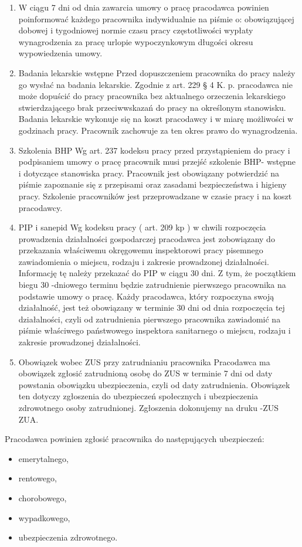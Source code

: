 \documentclass[a4paper, 11pt]{article}
\begin{document}
\begin{enumerate}

\item W ciągu 7 dni od dnia zawarcia umowy o pracę pracodawca powinien poinformować każdego pracownika indywidualnie na piśmie o:
obowiązującej dobowej i tygodniowej normie czasu pracy
częstotliwości wypłaty wynagrodzenia za pracę
urlopie wypoczynkowym
długości okresu wypowiedzenia umowy.
\item  Badania lekarskie wstępne
Przed dopuszczeniem pracownika do pracy należy go wysłać na badania lekarskie.
Zgodnie z art. 229 § 4 K. p. pracodawca nie może dopuścić do pracy pracownika bez aktualnego orzeczenia lekarskiego stwierdzającego brak przeciwwskazań do pracy na określonym stanowisku.
Badania lekarskie wykonuje się na koszt pracodawcy i w miarę możliwości w godzinach pracy.
Pracownik zachowuje za ten okres prawo do wynagrodzenia.
\item  Szkolenia BHP
Wg art. 237 kodeksu pracy przed przystąpieniem do pracy i podpisaniem umowy o pracę pracownik musi przejść szkolenie BHP- wstępne i dotyczące stanowiska pracy. Pracownik jest obowiązany potwierdzić na piśmie zapoznanie się z przepisami oraz zasadami bezpieczeństwa i higieny pracy.
Szkolenie pracowników jest przeprowadzane w czasie pracy i na koszt pracodawcy.
\item PIP i sanepid
Wg kodeksu pracy ( art. 209 kp ) w chwili rozpoczęcia prowadzenia działalności gospodarczej pracodawca jest zobowiązany do przekazania właściwemu okręgowemu inspektorowi pracy pisemnego zawiadomienia o miejscu, rodzaju i zakresie prowadzonej działalności. Informację tę należy przekazać do PIP w ciągu 30 dni. Z tym, że początkiem biegu 30 -dniowego terminu będzie zatrudnienie pierwszego pracownika na podstawie umowy o pracę.
Każdy pracodawca, który rozpoczyna swoją działalność, jest też obowiązany w terminie 30 dni od dnia rozpoczęcia tej działalności, czyli od zatrudnienia pierwszego pracownika zawiadomić na piśmie właściwego państwowego inspektora sanitarnego o miejscu, rodzaju i zakresie prowadzonej działalności.
\item Obowiązek wobec ZUS przy zatrudnianiu pracownika
Pracodawca ma obowiązek zgłosić zatrudnioną osobę do ZUS w terminie 7 dni od daty powstania obowiązku ubezpieczenia, czyli od daty zatrudnienia. Obowiązek ten dotyczy zgłoszenia do ubezpieczeń społecznych i ubezpieczenia zdrowotnego osoby zatrudnionej. Zgłoszenia dokonujemy na druku -ZUS ZUA.
\end{enumerate}
Pracodawca powinien zgłosić pracownika do następujących ubezpieczeń:
\begin{itemize}
\item emerytalnego,
\item rentowego,
\item chorobowego,
\item wypadkowego,
\item ubezpieczenia zdrowotnego.
\end{itemize}
\end{document}
